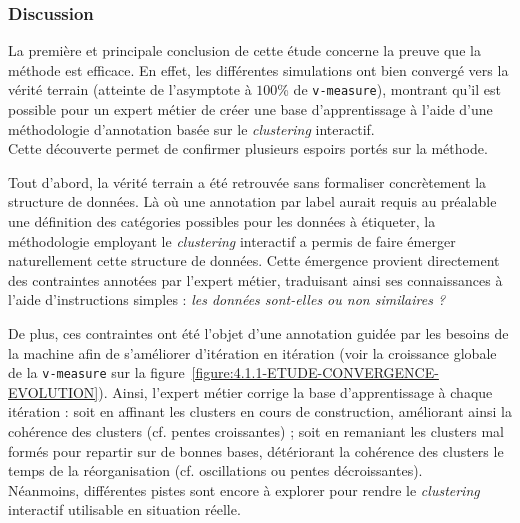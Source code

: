 		\subsubsection{Discussion}
			
			La première et principale conclusion de cette étude concerne la preuve que la méthode est efficace.
			En effet, les différentes simulations ont bien convergé vers la vérité terrain (atteinte de l'asymptote à $100$\% de \texttt{v-measure}), montrant qu'il est possible pour un expert métier de créer une base d'apprentissage à l'aide d'une méthodologie d'annotation basée sur le \textit{clustering} interactif. \\
			
			
			Cette découverte permet de confirmer plusieurs espoirs portés sur la méthode. 
			
			Tout d'abord, la vérité terrain a été retrouvée sans formaliser concrètement la structure de données.
			Là où une annotation par label aurait requis au préalable une définition des catégories possibles pour les données à étiqueter, la méthodologie employant le \textit{clustering} interactif a permis de faire émerger naturellement cette structure de données.
			Cette émergence provient directement des contraintes annotées par l'expert métier, traduisant ainsi ses connaissances à l'aide d'instructions simples : \textit{les données sont-elles ou non similaires ?}
			
			De plus, ces contraintes ont été l'objet d'une annotation guidée par les besoins de la machine afin de s'améliorer d'itération en itération (voir la croissance globale de la \texttt{v-measure} sur la figure~\ref{figure:4.1.1-ETUDE-CONVERGENCE-EVOLUTION}).
			Ainsi, l'expert métier corrige la base d'apprentissage à chaque itération : soit en affinant les clusters en cours de construction, améliorant ainsi la cohérence des clusters (cf. pentes croissantes) ; soit en remaniant les clusters mal formés pour repartir sur de bonnes bases, détériorant la cohérence des clusters le temps de la réorganisation (cf. oscillations ou pentes décroissantes). \\

			
			Néanmoins, différentes pistes sont encore à explorer pour rendre le \textit{clustering} interactif utilisable en situation réelle.
			

